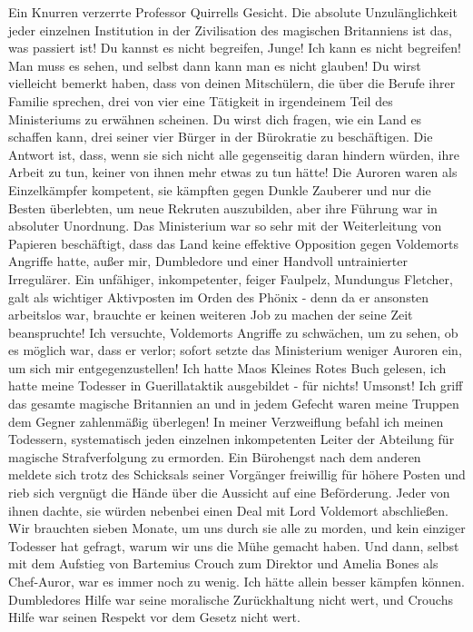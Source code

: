Ein Knurren verzerrte Professor Quirrells Gesicht. \glqq{}Die absolute
Unzulänglichkeit jeder einzelnen Institution in der Zivilisation des magischen
Britanniens ist das, was passiert ist! Du kannst es nicht begreifen, Junge! Ich
kann es nicht begreifen! Man muss es sehen, und selbst dann kann man es nicht
glauben! Du wirst vielleicht bemerkt haben, dass von deinen Mitschülern, die
über die Berufe ihrer Familie sprechen, drei von vier eine Tätigkeit in
irgendeinem Teil des Ministeriums zu erwähnen scheinen. Du wirst dich fragen,
wie ein Land es schaffen kann, drei seiner vier Bürger in der Bürokratie zu
beschäftigen. Die Antwort ist, dass, wenn sie sich nicht alle gegenseitig daran
hindern würden, ihre Arbeit zu tun, keiner von ihnen mehr etwas zu tun hätte!
Die Auroren waren als Einzelkämpfer kompetent, sie kämpften gegen Dunkle
Zauberer und nur die Besten überlebten, um neue Rekruten auszubilden, aber ihre
Führung war in absoluter Unordnung. Das Ministerium war so sehr mit der
Weiterleitung von Papieren beschäftigt, dass das Land keine effektive Opposition
gegen Voldemorts Angriffe hatte, außer mir, Dumbledore und einer Handvoll
untrainierter Irregulärer. Ein unfähiger, inkompetenter, feiger Faulpelz,
Mundungus Fletcher, galt als wichtiger Aktivposten im Orden des Phönix - denn da
er ansonsten arbeitslos war, brauchte er keinen weiteren Job zu machen der seine
Zeit beanspruchte! Ich versuchte, Voldemorts Angriffe zu schwächen, um zu sehen,
ob es möglich war, dass er verlor; sofort setzte das Ministerium weniger Auroren
ein, um sich mir entgegenzustellen! Ich hatte Maos Kleines Rotes Buch gelesen,
ich hatte meine Todesser in Guerillataktik ausgebildet - für nichts! Umsonst!
Ich griff das gesamte magische Britannien an und in jedem Gefecht waren meine
Truppen dem Gegner zahlenmäßig überlegen! In meiner Verzweiflung befahl ich
meinen Todessern, systematisch jeden einzelnen inkompetenten Leiter der
Abteilung für magische Strafverfolgung zu ermorden. Ein Bürohengst nach dem
anderen meldete sich trotz des Schicksals seiner Vorgänger freiwillig für höhere
Posten und rieb sich vergnügt die Hände über die Aussicht auf eine Beförderung.
Jeder von ihnen dachte, sie würden nebenbei einen Deal mit Lord Voldemort
abschließen. Wir brauchten sieben Monate, um uns durch sie alle zu morden, und
kein einziger Todesser hat gefragt, warum wir uns die Mühe gemacht haben. Und
dann, selbst mit dem Aufstieg von Bartemius Crouch zum Direktor und Amelia Bones
als Chef-Auror, war es immer noch zu wenig. Ich hätte allein besser kämpfen
können. Dumbledores Hilfe war seine moralische Zurückhaltung nicht wert, und
Crouchs Hilfe war seinen Respekt vor dem Gesetz nicht wert.\grqq{}

